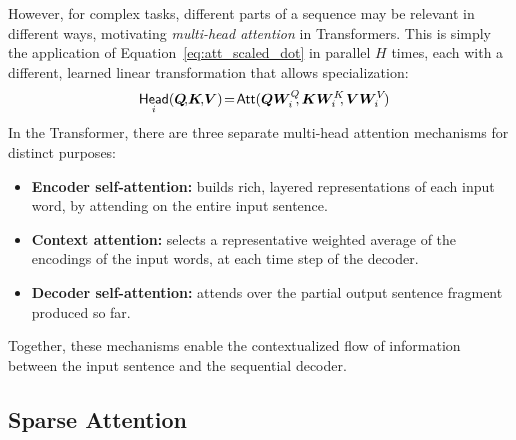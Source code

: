 \documentclass[11pt,a4paper]{article}
\DeclareMathOperator{\att}{\mathsf{Att}}
\DeclareMathOperator{\ath}{\mathsf{Head}}
\begin{document}
However, for complex tasks, different parts of a sequence may be relevant in
different ways, motivating \emph{multi-head attention} in Transformers.
This is simply the application of
Equation~\ref{eq:att_scaled_dot} in parallel $H$ times, each with a different,
learned linear transformation that allows specialization:
\begin{equation}\label{eq:head}\hspace{-.01ex}\ath_i(\bm{Q}\!,\!\bm{K}\!,\!\bm{V})\!=\!\att(\bm{QW}_i^Q\!\!,\bm{KW}_i^K\!\!,\bm{VW}_i^V\!)\hspace{-1.5ex}\end{equation}
In the Transformer, there are three separate multi-head attention mechanisms for
distinct purposes:
\begin{itemize}
\item \textbf{Encoder self-attention:} builds rich, layered representations of
each input word, by attending on the entire input sentence.
\item \textbf{Context attention:} selects
a representative weighted average of the encodings of the input words, at each
time step of the decoder.
\item \textbf{Decoder self-attention:} attends over the partial output sentence
fragment produced so far.
\end{itemize}
Together, these mechanisms enable the contextualized flow of information between
the input sentence and the sequential decoder.

\subsection{Sparse Attention}
\end{document}
